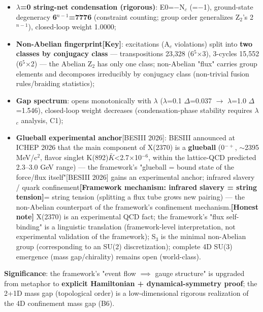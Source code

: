 \documentclass[12pt]{article}
\newcommand{\mtag}[1]{\textbf{[#1]}}
\newcommand{\up}[1]{\ensuremath{^{#1}}}
\newcommand{\down}[1]{\ensuremath{_{#1}}}
\begin{document}
\begin{itemize}
\item \textbf{\ensuremath{\lambda}=0 string-net condensation (rigorous)}: E0=\ensuremath{-}N\down{c} (=\ensuremath{-}1), ground-state degeneracy \textbf{6\up{n-1}=7776} (constraint counting; group order generalizes Z\down{2}'s 2\up{n-1}), closed-loop weight 1.0000;
\item \textbf{Non-Abelian fingerprint\mtag{Key}}: excitations (A\down{c} violations) split into \textbf{two classes by conjugacy class} --- transpositions 23,328 (6\up{5}\ensuremath{\times}3), 3-cycles 15,552 (6\up{5}\ensuremath{\times}2) --- the Abelian Z\down{2} has only one class; non-Abelian "flux" carries group elements and decomposes irreducibly by conjugacy class (non-trivial fusion rules/braiding statistics);
\item \textbf{Gap spectrum}: opens monotonically with \ensuremath{\lambda} (\ensuremath{\lambda}=0.1 \ensuremath{\Delta}=0.037 \ensuremath{\to} \ensuremath{\lambda}=1.0 \ensuremath{\Delta}=1.546), closed-loop weight decreases (condensation-phase stability requires \ensuremath{\lambda}\down{c} analysis, C1);
\item \textbf{Glueball experimental anchor}[BESIII 2026]: BESIII announced at ICHEP 2026 that the main component of X(2370) is a \textbf{glueball} (0\up{-+}, \ensuremath{\sim}2395 MeV/c\up{2}, flavor singlet K(892)\ensuremath{\bar{K}}<2.7\ensuremath{\times}10\up{-6}, within the lattice-QCD predicted 2.3--3.0 GeV range) --- the framework's "glueball = bound state of the force/flux itself"[BESIII 2026] gains an experimental anchor; infrared slavery / quark confinement\mtag{Framework mechanism: infrared slavery = string tension}= string tension (splitting a flux tube grows new pairing) --- the non-Abelian counterpart of the framework's confinement mechanism.\mtag{Honest note} X(2370) is an experimental QCD fact; the framework's "flux self-binding" is a linguistic translation (framework-level interpretation, not experimental validation of the framework); S\down{3} is the minimal non-Abelian group (corresponding to an SU(2) discretization); complete 4D SU(3) emergence (mass gap/chirality) remains open (world-class).
\end{itemize}

\textbf{Significance}: the framework's "event flow \ensuremath{\implies} gauge structure" is upgraded from metaphor to \textbf{explicit Hamiltonian + dynamical-symmetry proof}; the 2+1D mass gap (topological order) is a low-dimensional rigorous realization of the 4D confinement mass gap (B6).
\end{document}
